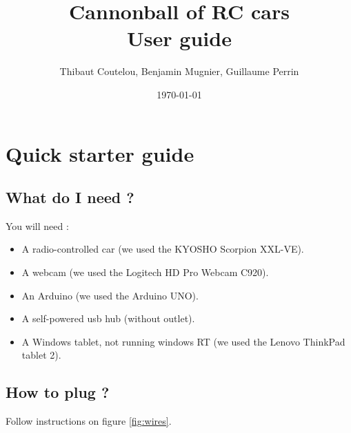 \documentclass[a4paper,11pt]{report}
\title{Cannonball of RC cars\\User guide}
\author{Thibaut Coutelou, Benjamin Mugnier, Guillaume Perrin}
\date{\today}
\begin{document}
\maketitle
\tableofcontents

\setlength{\parskip}{3mm}




\chapter{Quick starter guide}

\section{What do I need ?}

You will need :
\begin{itemize}

    \item A radio-controlled car (we used the KYOSHO Scorpion XXL-VE).

    \item A webcam (we used the Logitech HD Pro Webcam C920).

    \item An Arduino (we used the Arduino UNO).

    \item A self-powered usb hub (without outlet).

    \item A Windows tablet, not running windows RT (we used the Lenovo ThinkPad
        tablet 2).

\end{itemize}

\section{How to plug ?}

Follow instructions on figure \ref{fig:wires}.
\end{document}
